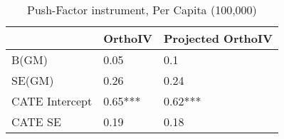 \begin{table}\centering\caption{Push-Factor instrument, Per Capita (100,000)}\begin{tabular}{lll}
\toprule
                & OrthoIV   & Projected OrthoIV   \\
\midrule
 B(GM)          & 0.05      & 0.1                 \\
 SE(GM)         & 0.26      & 0.24                \\
 CATE Intercept & 0.65***   & 0.62***             \\
 CATE SE        & 0.19      & 0.18                \\
\bottomrule
\end{tabular}\end{table}